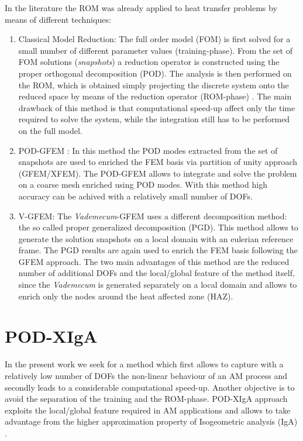 \documentclass[3p]{article}
\begin{document}
In the literature the ROM was already applied to heat transfer problems by means of different techniques:
\begin{enumerate}
\item Classical Model Reduction: The full order model (FOM) is first solved for a small number of different parameter values (training-phase). From the set of FOM solutions (\textit{snapshots}) a reduction operator is constructed using the proper orthogonal decomposition (POD). The analysis is then performed on the ROM, which is obtained simply projecting the discrete system onto the reduced space by means of the reduction operator (ROM-phase) \cite{Michopoulos2014a}.
The main drawback of this method is that computational speed-up affect only the time required to solve the system, while the integration still has to be performed on the full model.
\item {POD-GFEM} \cite{Aquino2008}: In this method the POD modes extracted from the set of snapshots are used to enriched the FEM basis via partition of unity \cite{Babuska1997} approach (GFEM/XFEM). The POD-GFEM allows to integrate and solve the problem on a coarse mesh enriched using POD modes. With this method high accuracy can be achived with a relatively small number of DOFs.
\item {V-GFEM}: The \textit{Vademecum}-GFEM \cite{Canales2016a} uses a different decomposition method: the so called proper generalized decomposition (PGD). This method allows to generate the solution snapshots on a local domain with an eulerian reference frame. The PGD results are again used to enrich the FEM basis following the GFEM approach. The two main advantages of this method are the reduced number of additional DOFs and the local/global feature of the method itself, since the \textit{Vademecum} is generated separately on a local domain and allows to enrich only the nodes around the heat affected zone (HAZ).
\end{enumerate}


\section*{POD-XIgA}

In the present work we seek for a method which first allows to capture with a relatively low number of DOFs the non-linear behaviour of an AM process and secondly leads to a considerable computational speed-up. Another objective is to avoid the separation of the training and the ROM-phase. POD-XIgA approach exploits the local/global feature required in AM applications and allows to take advantage from the higher approximation property of Isogeometric analysis (IgA) \cite{cottrell_isogeometric_2009}.
\end{document}

